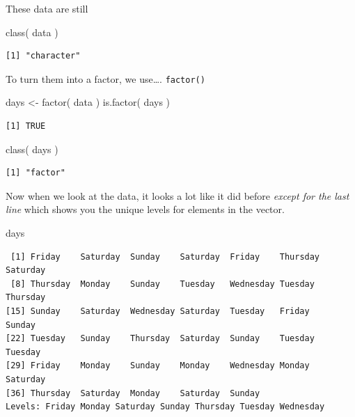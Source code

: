\documentclass[
  letterpaper,
]{book}
\newenvironment{Shaded}{\begin{snugshade}}{\end{snugshade}}
\newcommand{\FunctionTok}[1]{\textcolor[rgb]{0.28,0.35,0.67}{#1}}
\newcommand{\NormalTok}[1]{\textcolor[rgb]{0.00,0.23,0.31}{#1}}
\newcommand{\OtherTok}[1]{\textcolor[rgb]{0.00,0.23,0.31}{#1}}
\begin{document}
These data are still

\begin{Shaded}
\begin{Highlighting}[]
\FunctionTok{class}\NormalTok{( data )}
\end{Highlighting}
\end{Shaded}

\begin{verbatim}
[1] "character"
\end{verbatim}

To turn them into a factor, we use\ldots. \texttt{factor()}

\begin{Shaded}
\begin{Highlighting}[]
\NormalTok{days }\OtherTok{\textless{}{-}} \FunctionTok{factor}\NormalTok{( data )}
\FunctionTok{is.factor}\NormalTok{( days )}
\end{Highlighting}
\end{Shaded}

\begin{verbatim}
[1] TRUE
\end{verbatim}

\begin{Shaded}
\begin{Highlighting}[]
\FunctionTok{class}\NormalTok{( days )}
\end{Highlighting}
\end{Shaded}

\begin{verbatim}
[1] "factor"
\end{verbatim}

Now when we look at the data, it looks a lot like it did before
\emph{except for the last line} which shows you the unique levels for
elements in the vector.

\begin{Shaded}
\begin{Highlighting}[]
\NormalTok{days}
\end{Highlighting}
\end{Shaded}

\begin{verbatim}
 [1] Friday    Saturday  Sunday    Saturday  Friday    Thursday  Saturday 
 [8] Thursday  Monday    Sunday    Tuesday   Wednesday Tuesday   Thursday 
[15] Sunday    Saturday  Wednesday Saturday  Tuesday   Friday    Sunday   
[22] Tuesday   Sunday    Thursday  Saturday  Sunday    Tuesday   Tuesday  
[29] Friday    Monday    Sunday    Monday    Wednesday Monday    Saturday 
[36] Thursday  Saturday  Monday    Saturday  Sunday   
Levels: Friday Monday Saturday Sunday Thursday Tuesday Wednesday
\end{verbatim}
\end{document}
